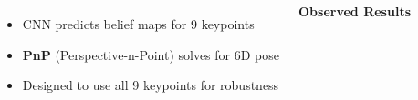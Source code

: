 \documentclass[serif, aspectratio=169, 9pt]{beamer}
\begin{document}
\begin{frame}
\begin{columns}
\begin{center}
        \end{center}
        \vspace{0.2em}
        \begin{itemize}
            \item CNN predicts belief maps for 9 keypoints
            \item \textbf{PnP} (Perspective-n-Point) solves for 6D pose
            \item Designed to use all 9 keypoints for robustness
        \end{itemize}
        \vspace{0.3em}
        \textbf{Observed Results}
        \begin{itemize}

\end{itemize}
\end{columns}
\end{frame}
\end{document}
